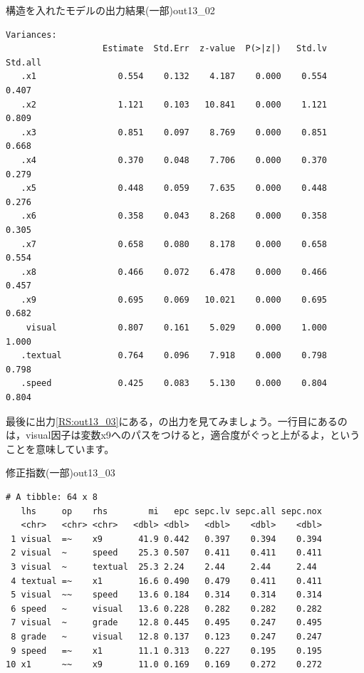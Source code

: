 \documentclass{ltjsbook}
\begin{document}
\begin{Rscreen}{構造を入れたモデルの出力結果(一部)}{out13_02}
\begin{verbatim}
Variances:
                   Estimate  Std.Err  z-value  P(>|z|)   Std.lv  Std.all
   .x1                0.554    0.132    4.187    0.000    0.554    0.407
   .x2                1.121    0.103   10.841    0.000    1.121    0.809
   .x3                0.851    0.097    8.769    0.000    0.851    0.668
   .x4                0.370    0.048    7.706    0.000    0.370    0.279
   .x5                0.448    0.059    7.635    0.000    0.448    0.276
   .x6                0.358    0.043    8.268    0.000    0.358    0.305
   .x7                0.658    0.080    8.178    0.000    0.658    0.554
   .x8                0.466    0.072    6.478    0.000    0.466    0.457
   .x9                0.695    0.069   10.021    0.000    0.695    0.682
    visual            0.807    0.161    5.029    0.000    1.000    1.000
   .textual           0.764    0.096    7.918    0.000    0.798    0.798
   .speed             0.425    0.083    5.130    0.000    0.804    0.804
\end{verbatim}
\end{Rscreen}

最後に出力\ref{RS:out13_03}にある，の出力を見てみましょう。一行目にあるのは，visual因子は変数x9へのパスをつけると，適合度がぐっと上がるよ，ということを意味しています。
\begin{Rscreen}{修正指数(一部)}{out13_03}
	\begin{verbatim}
# A tibble: 64 x 8
   lhs     op    rhs        mi   epc sepc.lv sepc.all sepc.nox
   <chr>   <chr> <chr>   <dbl> <dbl>   <dbl>    <dbl>    <dbl>
 1 visual  =~    x9       41.9 0.442   0.397    0.394    0.394
 2 visual  ~     speed    25.3 0.507   0.411    0.411    0.411
 3 visual  ~     textual  25.3 2.24    2.44     2.44     2.44 
 4 textual =~    x1       16.6 0.490   0.479    0.411    0.411
 5 visual  ~~    speed    13.6 0.184   0.314    0.314    0.314
 6 speed   ~     visual   13.6 0.228   0.282    0.282    0.282
 7 visual  ~     grade    12.8 0.445   0.495    0.247    0.495
 8 grade   ~     visual   12.8 0.137   0.123    0.247    0.247
 9 speed   =~    x1       11.1 0.313   0.227    0.195    0.195
10 x1      ~~    x9       11.0 0.169   0.169    0.272    0.272
\end{verbatim}
\end{Rscreen}
\end{document}
